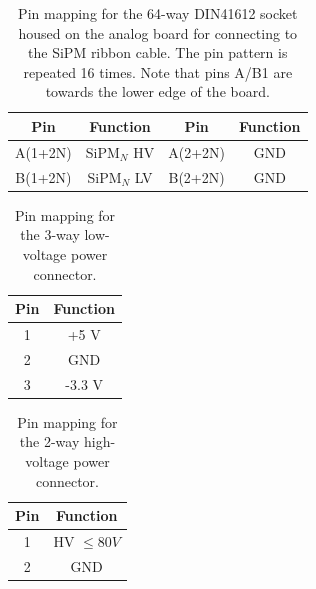 \documentclass[a4paper]{article}
\begin{document}
\begin{table}[h]
    \begin{center}
        \caption{Pin mapping for the 64-way DIN41612 socket housed on the analog board for connecting to the SiPM ribbon cable. The pin pattern is repeated 16 times. Note that pins A/B1 are towards the lower edge of the board.}
        \label{tab:IDC64way}
        \begin{tabular}{cc|cc}
            \hline
            \hline
            Pin & Function & Pin & Function \\
            \hline
            A(1+2N) & SiPM$_N$ HV & A(2+2N) & GND \\
            B(1+2N) & SiPM$_N$ LV & B(2+2N) & GND \\
            \hline
            \hline
        \end{tabular}
    \end{center}
\end{table}

\begin{table}[h]
    \begin{center}
        \caption{Pin mapping for the 3-way low-voltage power connector.}
        \label{tab:LVPower}
        \begin{tabular}{cc}
            \hline
            \hline
            Pin & Function \\
            \hline
            1 & +5 V \\
            2 & GND \\
            3 & -3.3 V \\
            \hline
            \hline
        \end{tabular}
    \end{center}
\end{table}

\begin{table}[h]
    \begin{center}
        \caption{Pin mapping for the 2-way high-voltage power connector.}
        \label{tab:HVPower}
        \begin{tabular}{cc}
            \hline
            \hline
            Pin & Function \\
            \hline
            1 & HV $\le 80 V$ \\
            2 & GND \\
            \hline
            \hline
        \end{tabular}
    \end{center}
\end{table}
\end{document}
